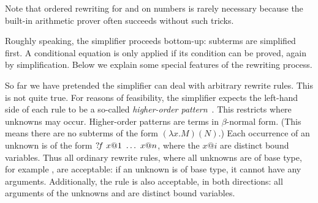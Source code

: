 \begin{isabellebody}
\begin{isamarkuptext}
Note that ordered rewriting for  and  on numbers is rarely
necessary because the built-in arithmetic prover often succeeds without
such tricks.%
\end{isamarkuptext}%
\isamarkuptrue%
%
\isamarkuptrue%
%
\begin{isamarkuptext}%
\label{sec:SimpHow}
Roughly speaking, the simplifier proceeds bottom-up: subterms are simplified
first.  A conditional equation is only applied if its condition can be
proved, again by simplification.  Below we explain some special features of
the rewriting process.%
\end{isamarkuptext}%
\isamarkuptrue%
%
\isamarkuptrue%
%
\begin{isamarkuptext}%
So far we have pretended the simplifier can deal with arbitrary
rewrite rules. This is not quite true.  For reasons of feasibility,
the simplifier expects the
left-hand side of each rule to be a so-called \emph{higher-order
pattern}~\cite{nipkow-patterns}. 
This restricts where
unknowns may occur.  Higher-order patterns are terms in $\beta$-normal
form.  (This means there are no subterms of the form $(\lambda x. M)(N)$.)  
Each occurrence of an unknown is of the form
${?\!f}~x@1~\dots~x@n$, where the $x@i$ are distinct bound
variables. Thus all ordinary rewrite rules, where all unknowns are
of base type, for example , are acceptable: if an unknown is
of base type, it cannot have any arguments. Additionally, the rule
 is also acceptable, in
both directions: all arguments of the unknowns  and
 are distinct bound variables.


\end{isamarkuptext}
\end{isabellebody}
